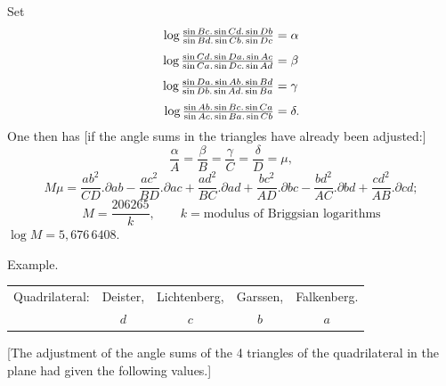 Set
\[
\begin{aligned}
\log\tfrac{\sin Bc.\sin Cd.\sin Db}{\sin Bd.\sin Cb.\sin Dc}&=\alpha\\[4pt]
\log\tfrac{\sin Cd.\sin Da.\sin Ac}{\sin Ca.\sin Dc.\sin Ad}&=\beta\\[4pt]
\log\tfrac{\sin Da.\sin Ab.\sin Bd}{\sin Db.\sin Ad.\sin Ba}&=\gamma\\[4pt]
\llap{\raisebox{-.5ex}{\text{\tiny.}}\hspace{3.5cm}}\log\tfrac{\sin Ab.\sin Bc.\sin Ca}{\sin Ac.\sin Ba.\sin Cb}&=\delta.
\end{aligned}
\]
One then has [if the angle sums in the triangles have already been adjusted:]
\[
\frac\alpha A=\frac\beta B=\frac\gamma C=\frac\delta D=\mu,
\]
\[
M\mu=\frac{ab^2}{CD}.\partial ab-\frac{ac^2}{BD}.\partial ac+\frac{ad^2}{BC}.\partial ad+\frac{bc^2}{AD}.\partial bc-\frac{bd^2}{AC}.\partial bd+\frac{cd^2}{AB}.\partial cd;
\]
\[
M=\frac{206265}{k},\qquad k=\text{modulus of Briggsian logarithms}
\]
\noindent\hspace*{.7cm}$\log M=5{,}676\,6408$.
\begin{center}Example.\end{center}
\begin{center}
\begin{tabular}{rcccc}
Quadrilateral:&Deister,&Lichtenberg,&Garssen,&Falkenberg.\\
&$d$&$c$&$b$&$a$
\end{tabular}
\end{center}
[The adjustment of the angle sums of the 4 triangles of the quadrilateral in the plane had given the following values.]

